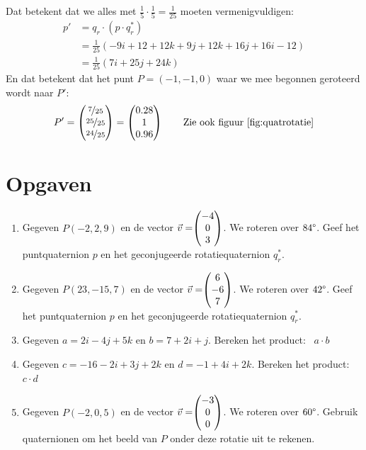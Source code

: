 Dat betekent dat we alles met $\frac{1}{5} \cdot\frac{1}{5} = \frac{1}{25}$ moeten vermenigvuldigen: 
\begin{align*}
    p' &=  q_r\cdot (p\cdot q^*_r)  \\
       &=  \frac{1}{25}(-9i + 12 +12k + 9j + 12k + 16j + 16i - 12) \\
       & = \frac{1}{25} (7i + 25j + 24k)
\end{align*}
En dat betekent dat het punt $ P=(-1,-1,0)  $ waar we mee begonnen  geroteerd wordt naar $P'$:
\[
    P'= \begin{pmatrix} \nicefrac{7}{25} \\ \nicefrac{25}{25} \\ \nicefrac{24}{25} \end{pmatrix} = \begin{pmatrix} 0.28 \\ 1 \\ 0.96 \end{pmatrix}  \qquad \text{Zie ook figuur \ref{fig:quatrotatie}}
\]


\newpage
\section{Opgaven}
\begin{enumerate}
    \setlength{\itemsep}{10pt}
	\item Gegeven $P (-2, 2, 9)$ en de vector $\vec{v} = \vecdrie{-4}{0}{3} $. 
	We roteren over $84\degree$. Geef het puntquaternion $p$ en het geconjugeerde rotatiequaternion $q_r^*$. 
 
	\item Gegeven $P (23, -15, 7)$ en de vector $\vec{v} = \vecdrie{6}{-6}{7} $. 
	We roteren over $42\degree$. Geef het puntquaternion $p$ en het geconjugeerde rotatiequaternion  $q_r^*$.
	
	\item Gegeven $a = 2i-4j+5k$ en $b = 7+2i+j$. Bereken het product: \ $a\cdot b$
 
	\item Gegeven $c = -16 -2i+3j+2k$ en $d = -1+4i+2k$. Bereken het product: \ $c\cdot d$
 
	\item Gegeven $P (-2, 0, 5)$ en de vector $\vec{v} = \vecdrie{-3}{0}{0} $. 
	We roteren over $60\degree$. Gebruik quaternionen om het beeld van $P$ onder deze rotatie uit te rekenen.
\end{enumerate}

\newpage
